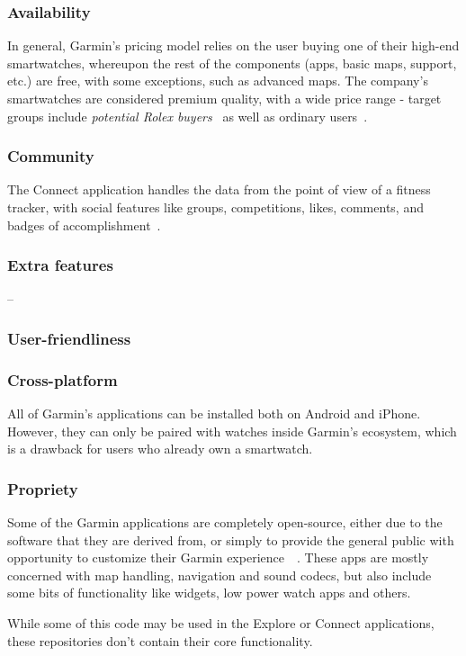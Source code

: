 \subsubsection*{Availability}
In general, Garmin's pricing model relies on the user buying one of their high-end smartwatches, whereupon the rest of the components (apps, basic maps, support, etc.) are free, with some exceptions, such as advanced maps. 
The company's smartwatches are considered premium quality, with a wide price range - target groups include \textit{potential Rolex buyers}~\cite{garmin-expensive} as well as ordinary users~\cite{garmin-watches-review}.
\subsubsection*{Community}
The Connect application handles the data from the point of view of a fitness tracker, with social features like groups, competitions, likes, comments, and badges of accomplishment~\cite{garmin-connect}.
\subsubsection*{Extra features} -- 
\subsubsection*{User-friendliness}

\subsubsection*{Cross-platform}
All of Garmin's applications can be installed both on Android and iPhone.
However, they can only be paired with watches inside Garmin's ecosystem, which is a drawback for users who already own a smartwatch.
\subsubsection*{Propriety}
Some of the Garmin applications are completely open-source, either due to the software that they are derived from, or simply to provide the general public with opportunity to customize their Garmin experience~\cite{garmin-open-source}~\cite{garmin-connect-github-repos}.
These apps are mostly concerned with map handling, navigation and sound codecs, but also include some bits of functionality like widgets, low power watch apps and others.

While some of this code may be used in the Explore or Connect applications, these repositories don't contain their core functionality.


